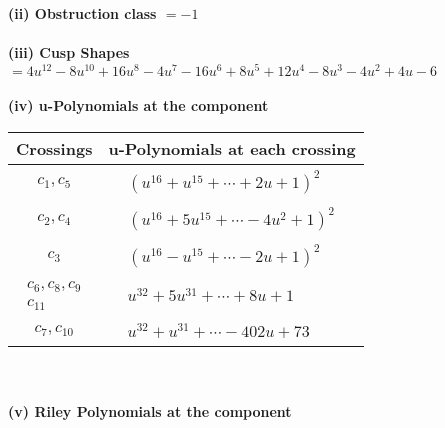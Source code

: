 \documentclass[1p]{elsarticle_modified}
\theoremstyle{definition}
\begin{document}
\flushleft \textbf{(ii) Obstruction class $= -1$}\\~\\
\flushleft \textbf{(iii) Cusp Shapes $= 4 u^{12}-8 u^{10}+16 u^8-4 u^7-16 u^6+8 u^5+12 u^4-8 u^3-4 u^2+4 u-6$}\\~\\
\newpage\renewcommand{\arraystretch}{1}
\flushleft \textbf{(iv) u-Polynomials at the component}\newline \\
\begin{tabular}{m{50pt}|m{274pt}}
Crossings & \hspace{64pt}u-Polynomials at each crossing \\
\hline $$\begin{aligned}c_{1},c_{5}\end{aligned}$$&$\begin{aligned}
&(u^{16}+u^{15}+\cdots+2 u+1)^{2}
\end{aligned}$\\
\hline $$\begin{aligned}c_{2},c_{4}\end{aligned}$$&$\begin{aligned}
&(u^{16}+5 u^{15}+\cdots-4 u^2+1)^{2}
\end{aligned}$\\
\hline $$\begin{aligned}c_{3}\end{aligned}$$&$\begin{aligned}
&(u^{16}- u^{15}+\cdots-2 u+1)^{2}
\end{aligned}$\\
\hline $$\begin{aligned}c_{6},c_{8},c_{9}\\c_{11}\end{aligned}$$&$\begin{aligned}
&u^{32}+5 u^{31}+\cdots+8 u+1
\end{aligned}$\\
\hline $$\begin{aligned}c_{7},c_{10}\end{aligned}$$&$\begin{aligned}
&u^{32}+u^{31}+\cdots-402 u+73
\end{aligned}$\\
\hline
\end{tabular}\\~\\
\newpage\renewcommand{\arraystretch}{1}
\flushleft \textbf{(v) Riley Polynomials at the component}\newline \\
\end{document}
